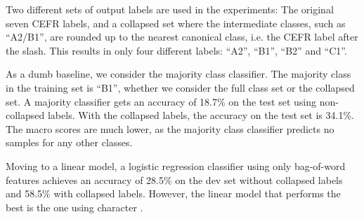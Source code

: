 Two different sets of output labels are used in the experiments: The original
seven CEFR labels, and a collapsed set where the intermediate classes, such
as ``A2/B1'', are rounded up to the nearest canonical class, i.e. the CEFR
label after the slash. This results in only four different labels: ``A2'',
``B1'', ``B2'' and ``C1''.

As a dumb baseline, we consider the majority class classifier. The majority
class in the training set is ``B1'', whether we consider the full class set
or the collapsed set. A majority classifier gets an accuracy of 18.7\% on the
test set using non-collapsed labels. With the collapsed labels, the accuracy
on the test set is 34.1\%. The macro \FI scores are much lower, as the
majority class classifier predicts no samples for any other classes.

Moving to a linear model, a logistic regression classifier using only
bag-of-word features achieves an accuracy of 28.5\% on the dev set without
collapsed labels and 58.5\% with collapsed labels. However, the linear model
that performs the best is the one using character \ngrams.

